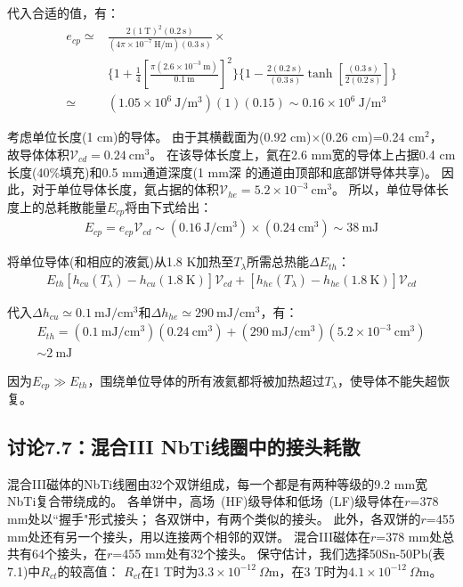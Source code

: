 代入合适的值，有：
\begin{align*}%
e_{cp}\simeq&\frac{2(1\ \mathrm{T})^2(0.2\ \mathrm{s})}{(4\pi\times 10^{-7}\ \mathrm{H/m})(0.3\ \mathrm{s})}\times \\
&\{1+\frac{1}{4}\left[\frac{\pi(2.6\times 10^{-3}\ \mathrm{m})}{0.1\ \mathrm{m}}\right]^2\}\{1-\frac{2(0.2\ \mathrm{s})}{(0.3\ \mathrm{s})}\tanh\left[\frac{(0.3\ \mathrm{s})}{2(0.2\ \mathrm{s})}\right]\}  \\
\simeq&(1.05\times 10^6\ \mathrm{J/m^3})(1)(0.15)\sim 0.16\times 10^6\ \mathrm{J/m^3}
\end{align*}

考虑单位长度(1 cm)的导体。
由于其横截面为(0.92 cm)$\times$(0.26 cm)=0.24 $\mathrm{cm^2}$，
故导体体积$\mathcal{V}_{cd}=0.24\ \mathrm{cm^3}$。
在该导体长度上，氦在2.6 mm宽的导体上占据0.4 cm长度(40\%填充)和0.5 mm通道深度(1 mm深
的通道由顶部和底部饼导体共享)。
因此，对于单位导体长度，氦占据的体积$\mathcal{V}_{he}=5.2\times 10^{-3}\ \mathrm{cm^3}$。
所以，单位导体长度上的总耗散能量$E_{cp}$将由下式给出：
\begin{align*}%
E_{cp}=e_{cp}\mathcal{V}_{cd}
\sim(0.16\ \mathrm{J/cm^3})\times(0.24\ \mathrm{cm^3})\sim 38\ \mathrm{mJ} \tag{S7.9}
\end{align*}

将单位导体(和相应的液氦)从1.8 K加热至$T_\lambda$所需总热能$\Delta E_{th}$：
\begin{align*}%
E_{th}[h_{cu}(T_\lambda)-h_{cu}(1.8\ \mathrm{K})]\mathcal{V}_{cd}+[h_{he}(T_\lambda)-h_{he}(1.8\ \mathrm{K})]\mathcal{V}_{cd} \tag{S7.10}
\end{align*}

代入$\Delta h_{cu}\simeq 0.1\ \mathrm{mJ/cm^3}$和$\Delta h_{he}\simeq 290\ \mathrm{mJ/cm^3}$，有：
\begin{align*}%
E_{th}=(0.1\ \mathrm{mJ/cm^3})(0.24\ \mathrm{cm^3})+(290\ \mathrm{mJ/cm^3})(5.2\times 10^{-3}\ \mathrm{cm^3}) \\\tag{S7.11}
\sim 2\ \mathrm{mJ}
\end{align*}

因为$E_{cp}\gg E_{th}$，围绕单位导体的所有液氦都将被加热超过$T_\lambda$，使导体不能失超恢复。



\subsection{讨论7.7：混合III NbTi线圈中的接头耗散}
混合III磁体的NbTi线圈由32个双饼组成，每一个都是有两种等级的9.2 mm宽NbTi复合带绕成的。
各单饼中，高场~(HF)级导体和低场~(LF)级导体在$r$=378 mm处以``握手"形式接头；
各双饼中，有两个类似的接头。
此外，各双饼的$r$=455 mm处还有另一个接头，用以连接两个相邻的双饼。
混合III磁体在$r$=378 mm处总共有64个接头，在$r$=455 mm处有32个接头。
保守估计，我们选择50Sn-50Pb(表7.1)中$R_{ct}$的较高值：
$R_{ct}$在1 T时为$3.3\times 10^{-12}\ \Omega\mathrm{m}$，在3 T时为$4.1\times 10^{-12}\ \Omega \mathrm{m}$。

